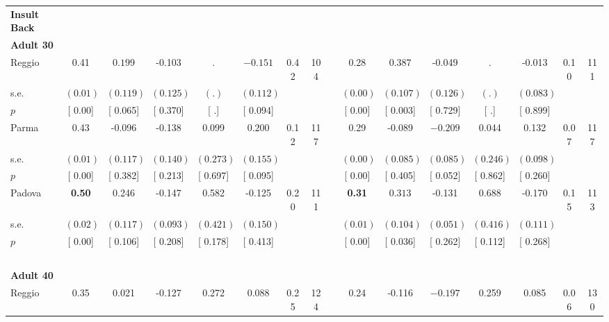 \begin{longtable}{L{8em} c c c c c c c p{1em} c c c c c c c}
\textbf{Insult Back} \\*
\quad \quad \textbf{Adult 30} & & & & & & & & & & & & & & & \\* 
\quad \quad \quad Reggio& 0.41 & $ \mathbf{    0.199}$ &    -0.103 &         . & $ \mathbf{   -0.151}$ &      0.42 &       104 & & 0.28 & $ \mathbf{    0.387}$ &    -0.049 &         . &    -0.013 &      0.10 &       111  \\*
\quad \quad \quad \quad s.e.& $ (     0.01)$ & $ (    0.119)$ & $ (    0.125)$ & $ (        .)$ & $ (    0.112)$ & & & & $ (     0.00)$ & $ (    0.107)$ & $ (    0.126)$ & $ (        .)$ & $ (    0.083)$ & &  \\*
\quad \quad \quad \quad $ p$ & [     0.00] & [    0.065] & [    0.370] & [        .] & [    0.094] & & & & [     0.00] & [    0.003] & [    0.729] & [        .] & [    0.899] & &  \\[1em]
\quad \quad \quad Parma& 0.43 &    -0.096 &    -0.138 &     0.099 & $ \mathbf{    0.200}$ &      0.12 &       117 & & 0.29 &    -0.089 & $ \mathbf{   -0.209}$ &     0.044 &     0.132 &      0.07 &       117  \\*
\quad \quad \quad \quad s.e.& $ (     0.01)$ & $ (    0.117)$ & $ (    0.140)$ & $ (    0.273)$ & $ (    0.155)$ & & & & $ (     0.00)$ & $ (    0.085)$ & $ (    0.085)$ & $ (    0.246)$ & $ (    0.098)$ & &  \\*
\quad \quad \quad \quad $ p$ & [     0.00] & [    0.382] & [    0.213] & [    0.697] & [    0.095] & & & & [     0.00] & [    0.405] & [    0.052] & [    0.862] & [    0.260] & &  \\[1em]
\quad \quad \quad Padova& \textbf{     0.50} &     0.246 &    -0.147 &     0.582 &    -0.125 &      0.20 &       111 & & \textbf{     0.31} & $ \mathbf{    0.313}$ &    -0.131 &     0.688 &    -0.170 &      0.15 &       113  \\*
\quad \quad \quad \quad s.e.& $ (     0.02)$ & $ (    0.117)$ & $ (    0.093)$ & $ (    0.421)$ & $ (    0.150)$ & & & & $ (     0.01)$ & $ (    0.104)$ & $ (    0.051)$ & $ (    0.416)$ & $ (    0.111)$ & &  \\*
\quad \quad \quad \quad $ p$ & [     0.00] & [    0.106] & [    0.208] & [    0.178] & [    0.413] & & & & [     0.00] & [    0.036] & [    0.262] & [    0.112] & [    0.268] & &  \\[1em]
~\\[1em]
\quad \quad \textbf{Adult 40} & & & & & & & & & & & & & & & \\* 
\quad \quad \quad Reggio& 0.35 &     0.021 &    -0.127 &     0.272 &     0.088 &      0.25 &       124 & & 0.24 &    -0.116 & $ \mathbf{   -0.197}$ &     0.259 &     0.085 &      0.06 &       130  \\*

\end{longtable}

